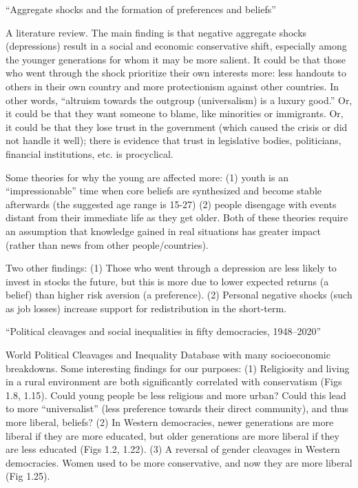 \documentclass{article}
\begin{document}
\medskip \noindent \textbf{\cite{giuliano2024aggregate}} ``Aggregate shocks and the formation of preferences and beliefs'' 

A literature review. The main finding is that negative aggregate shocks (depressions) result in a social and economic conservative shift, especially among the younger generations for whom it may be more salient. It could be that those who went through the shock prioritize their own interests more: less handouts to others in their own country and more protectionism against other countries. In other words, ``altruism towards the outgroup (universalism) is a luxury good.'' Or, it could be that they want someone to blame, like minorities or immigrants. Or, it could be that they lose trust in the government (which caused the crisis or did not handle it well); there is evidence that trust in legislative bodies, politicians, financial institutions, etc. is procyclical.

Some theories for why the young are affected more: (1) youth is an “impressionable” time when core beliefs are synthesized and become stable afterwards (the suggested age range is 15-27) (2) people disengage with events distant from their immediate life as they get older. Both of these theories require an assumption that knowledge gained in real situations has greater impact (rather than news from other people/countries).

Two other findings: (1) Those who went through a depression are less likely to invest in stocks the future, but this is more due to lower expected returns (a belief) than higher risk aversion (a preference). (2) Personal negative shocks (such as job losses) increase support for redistribution in the short-term.

\medskip \noindent \textbf{\cite{gethin2021political}} ``Political cleavages and social inequalities in fifty democracies, 1948–2020''

World Political Cleavages and Inequality Database with many socioeconomic breakdowns. Some interesting findings for our purposes: (1) Religiosity and living in a rural environment are both significantly correlated with conservatism (Figs 1.8, 1.15). Could young people be less religious and more urban? Could this lead to more ``universalist'' (less preference towards their direct community), and thus more liberal, beliefs? (2) In Western democracies, newer generations are more liberal if they are more educated, but older generations are more liberal if they are less educated (Figs 1.2, 1.22). (3) A reversal of gender cleavages in Western democracies. Women used to be more conservative, and now they are more liberal (Fig 1.25).
\end{document}
